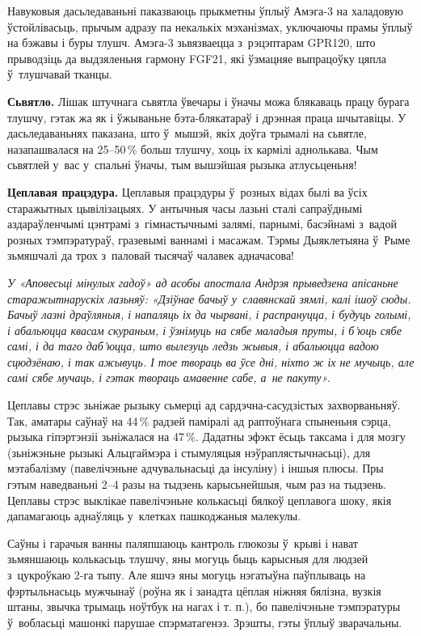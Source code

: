 Навуковыя дасьледаваньні паказваюць прыкметны ўплыў Амэга-3 на халадовую ўстойлівасьць, прычым адразу па некалькіх мэханізмах, уключаючы прамы ўплыў на бэжавы і буры тлушч. Амэга-3 зьвязваецца з~рэцэптарам GPR120, што прыводзіць да выдзяленьня гармону FGF21, які ўзмацняе выпрацоўку цяпла ў~тлушчавай тканцы.

\textbf{Сьвятло.} Лішак штучнага сьвятла ўвечары і ўначы можа блякаваць працу бурага тлушчу, гэтак жа як і ўжываньне бэта-блякатараў і дрэнная праца шчытавіцы. У дасьледаваньнях паказана, што ў~мышэй, якіх доўга трымалі на сьвятле, назапашвалася на 25--50\,\% больш тлушчу, хоць іх кармілі аднолькава. Чым сьвятлей у~вас у~спальні ўначы, тым вышэйшая рызыка атлусьценьня!

\textbf{Цеплавая працэдура.} Цеплавыя працэдуры ў~розных відах былі ва ўсіх старажытных цывілізацыях. У антычныя часы лазьні сталі сапраўднымі аздараўленчымі цэнтрамі з~гімнастычнымі залямі, парнымі, басэйнамі з~вадой розных тэмпэратураў, гразевымі ваннамі і масажам. Тэрмы Дыяклетыяна ў~Рыме зьмяшчалі да трох з~паловай тысячаў чалавек адначасова!

\emph{У «Аповесьці мінулых гадоў» ад асобы апостала Андрэя прыведзена апісаньне старажытнарускіх лазьняў: «Дзіўнае бачыў у~славянскай зямлі, калі ішоў сюды. Бачыў лазні драўляныя, і напаляць іх да чырвані, і распрануцца, і будуць голымі, і абальюцца квасам скураным, і ўзнімуць на сябе маладыя пруты, і б’юць сябе самі, і да таго даб’юцца, што вылезуць ледзь жывыя, і абальюцца вадою сцюдзёнаю, і так ажывуць. І тое твораць ва ўсе дні, ніхто ж іх не мучыць, але самі сябе мучаць, і гэтак твораць амавенне сабе, а~не пакуту».}

Цеплавы стрэс зьніжае рызыку сьмерці ад сардэчна-сасудзістых захворваньняў. Так, аматары саўнаў на 44\,\% радзей паміралі ад раптоўнага спыненьня сэрца, рызыка гіпэртэнзіі зьніжалася на 47\,\%. Дадатны эфэкт ёсьць таксама і для мозгу (зьніжэньне рызыкі Альцгаймэра і стымуляцыя нэўраплястычнасьці), для мэтабалізму (павелічэньне адчувальнасьці да інсуліну) і іншыя плюсы. Пры гэтым наведваньні 2--4 разы на тыдзень карысьнейшыя, чым раз на тыдзень. Цеплавы стрэс выклікае павелічэньне колькасьці бялкоў цеплавога шоку, якія дапамагаюць аднаўляць у~клетках пашкоджаныя малекулы.

Саўны і гарачыя ванны паляпшаюць кантроль глюкозы ў~крыві і нават зьмяншаюць колькасьць тлушчу, яны могуць быць карысныя для людзей з~цукроўкаю 2-га тыпу. Але яшчэ яны могуць нэгатыўна паўплываць на фэртыльнасьць мужчынаў (роўна як і занадта цёплая ніжняя бялізна, вузкія штаны, звычка трымаць ноўтбук на нагах і т. п.), бо павелічэньне тэмпэратуры ў~вобласьці машонкі парушае спэрматагенэз. Зрэшты, гэты ўплыў зварачальны.

